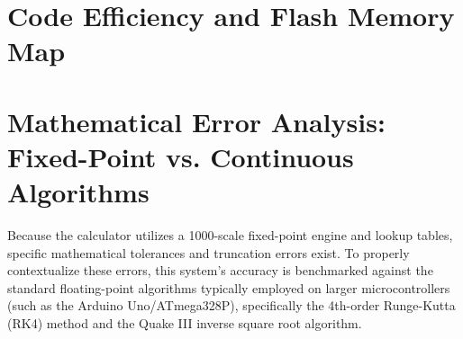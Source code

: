 \documentclass[conference]{IEEEtran}
\begin{document}
\section{Code Efficiency and Flash Memory Map}
\begin{table}[htbp]
\centering
\caption{Estimated Flash Memory Allocation}
\end{table}

\section{Mathematical Error Analysis: Fixed-Point vs. Continuous Algorithms}

Because the calculator utilizes a 1000-scale fixed-point engine and lookup tables, specific mathematical tolerances and truncation errors exist. To properly contextualize these errors, this system's accuracy is benchmarked against the standard floating-point algorithms typically employed on larger microcontrollers (such as the Arduino Uno/ATmega328P), specifically the 4th-order Runge-Kutta (RK4) method and the Quake III inverse square root algorithm.
\end{document}
